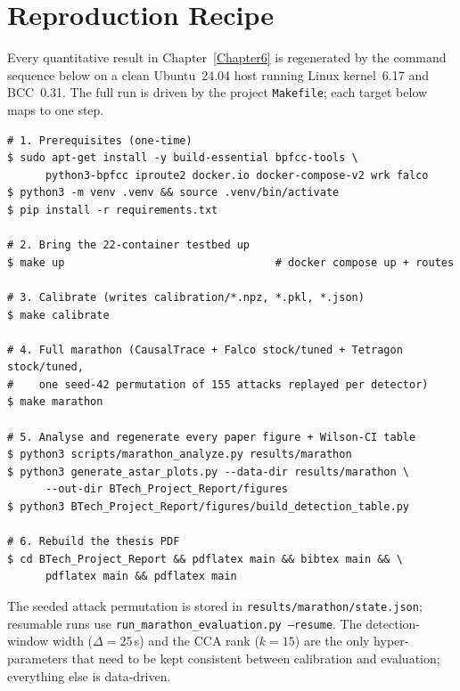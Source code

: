 \chapter{Reproduction Recipe}
\label{AppendixC}

Every quantitative result in Chapter~\ref{Chapter6} is regenerated by
the command sequence below on a clean Ubuntu~24.04 host running Linux
kernel~6.17 and BCC~0.31. The full run is driven by the project
\texttt{Makefile}; each target below maps to one step.

\begin{verbatim}
# 1. Prerequisites (one-time)
$ sudo apt-get install -y build-essential bpfcc-tools \
      python3-bpfcc iproute2 docker.io docker-compose-v2 wrk falco
$ python3 -m venv .venv && source .venv/bin/activate
$ pip install -r requirements.txt

# 2. Bring the 22-container testbed up
$ make up                                 # docker compose up + routes

# 3. Calibrate (writes calibration/*.npz, *.pkl, *.json)
$ make calibrate

# 4. Full marathon (CausalTrace + Falco stock/tuned + Tetragon stock/tuned,
#    one seed-42 permutation of 155 attacks replayed per detector)
$ make marathon

# 5. Analyse and regenerate every paper figure + Wilson-CI table
$ python3 scripts/marathon_analyze.py results/marathon
$ python3 generate_astar_plots.py --data-dir results/marathon \
      --out-dir BTech_Project_Report/figures
$ python3 BTech_Project_Report/figures/build_detection_table.py

# 6. Rebuild the thesis PDF
$ cd BTech_Project_Report && pdflatex main && bibtex main && \
      pdflatex main && pdflatex main
\end{verbatim}

The seeded attack permutation is stored in
\texttt{results/marathon/state.json}; resumable runs use
\texttt{run\_marathon\_evaluation.py --resume}. The detection-window
width ($\Delta = 25$\,s) and the CCA rank ($k = 15$) are the only
hyper-parameters that need to be kept consistent between calibration and
evaluation; everything else is data-driven.
